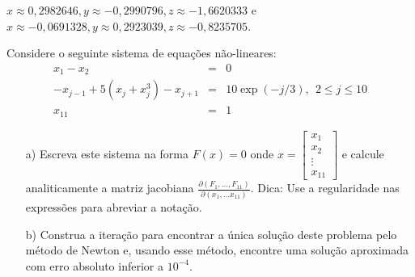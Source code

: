  \begin{resp}
 $x\approx 0,2982646, y\approx -0,2990796, z\approx- 1,6620333$  e $x\approx -0,0691328, y\approx 0,2923039, z\approx -0,8235705$.
 \end{resp}


\begin{exer}  Considere o seguinte sistema de equações não-lineares:
\begin{eqnarray}
x_1-x_2&=&0\nonumber\\
-x_{j-1}+5(x_j+x_j^3)-x_{j+1}&=&10\exp(-j/3),~~ 2\leq j \leq 10\nonumber\\
x_{11}&=&1
\end{eqnarray}
\begin{itemize}
\item [a)] Escreva este sistema na forma $F(x)=0$ onde $x=\left[\begin{array}{c} x_1\\ x_2\\ \vdots \\ x_{11}\end{array}\right]$ e calcule analiticamente a matriz jacobiana $\frac{\partial (F_1,\ldots, F_{11})}{\partial (x_1,\ldots x_{11})}$. Dica: Use a regularidade nas expressões para abreviar a notação.
\item [b)] Construa a iteração para encontrar a única solução deste problema pelo método de Newton e, usando esse método, encontre uma solução aproximada com erro absoluto inferior a $10^{-4}$.
\end{itemize}
\end{exer}


